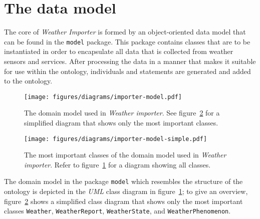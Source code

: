 \section{The data model}
\label{sec:importer_model}

The core of \emph{Weather Importer} is formed by an object-oriented data model that can be found in the \texttt{model} package. This package contains classes that are to be instantiated in order to encapsulate all data that is collected from weather sensors and services. After processing the data in a manner that makes it suitable for use within the \thinkhomeweather ontology, individuals and statements are generated and added to the ontology.

\begin{figure}
\centering
\texttt{[image: figures/diagrams/importer-model.pdf]}
\caption{The domain model used in \emph{Weather importer}. See figure~\ref{fig:importer_model2} for a simplified diagram that shows only the most important classes.}
\label{fig:importer_model1}
\end{figure}

\begin{figure}
\centering
\texttt{[image: figures/diagrams/importer-model-simple.pdf]}
\caption{The most important classes of the domain model used in \emph{Weather importer}. Refer to figure~\ref{fig:importer_model1} for a diagram showing all classes.}
\label{fig:importer_model2}
\end{figure}

The domain model in the package \texttt{model} which resembles the structure of the \thinkhomeweather ontology is depicted in the \emph{UML} class diagram in figure~\ref{fig:importer_model1}; to give an overview, figure~\ref{fig:importer_model2} shows a simplified class diagram that shows only the most important classes \texttt{Weather}, \texttt{WeatherReport}, \texttt{WeatherState}, and \texttt{WeatherPhenomenon}.

